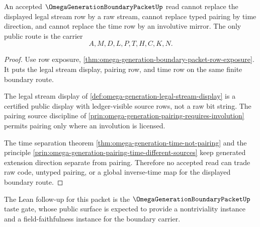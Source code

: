 \begin{theorem}
\label{thm:omega-generation-boundary-packet-nonescape}
An accepted $\OmegaGenerationBoundaryPacketUp$ read cannot replace the displayed legal stream row by a raw stream, cannot replace typed pairing by time direction, and cannot replace the time row by an involutive mirror. The only public route is the carrier
$$
A,M,D,L,P,T,H,C,K,N .
$$
\end{theorem}
\begin{proof}
Use row exposure, \autoref{thm:omega-generation-boundary-packet-row-exposure}. It puts the legal stream display, pairing row, and time row on the same finite boundary route.

The legal stream display of \autoref{def:omega-generation-legal-stream-display} is a certified public display with ledger-visible source rows, not a raw bit string. The pairing source discipline of \autoref{prin:omega-generation-pairing-requires-involution} permits pairing only where an involution is licensed.

The time separation theorem \autoref{thm:omega-generation-time-not-pairing} and the principle \autoref{prin:omega-generation-pairing-time-different-sources} keep generated extension direction separate from pairing. Therefore no accepted read can trade raw code, untyped pairing, or a global inverse-time map for the displayed boundary route.
\end{proof}



The Lean follow-up for this packet is the $\OmegaGenerationBoundaryPacketUp$ taste gate, whose public surface is expected to provide a nontriviality instance and a field-faithfulness instance for the boundary carrier.


